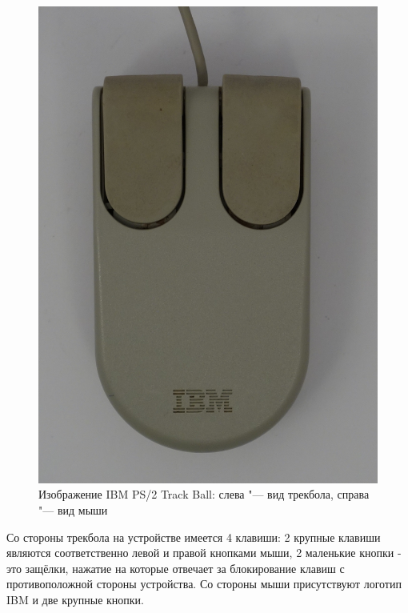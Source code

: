 \documentclass[11pt, a4paper]{article}
\begin{document}
\begin{figure}[h]
    \includegraphics[scale=0.5]{1992_ibm_convertible/2.13.JPG}
    \caption{Изображение IBM PS/2 Track Ball: слева "--- вид трекбола, справа "--- вид мыши}
    \label{fig:IBMConvertibleTopAndBottom}
\end{figure}
    
    Со стороны трекбола на устройстве имеется 4 клавиши: 2 крупные клавиши являются соответственно левой и правой кнопками мыши, 2 маленькие кнопки - это защёлки, нажатие на которые отвечает за блокирование клавиш с противоположной стороны устройства. Со стороны мыши присутствуют логотип IBM и две крупные кнопки.

    
\end{document}

